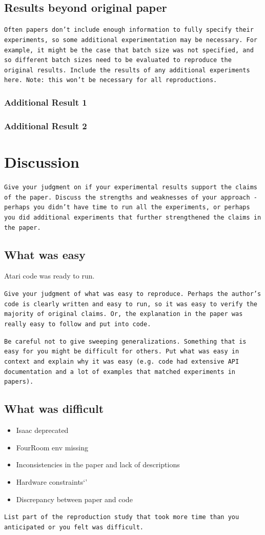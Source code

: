 \documentclass[10pt]{article} %
\begin{document}
\subsection{Results beyond original paper}
\texttt{Often papers don't include enough information to fully specify their experiments, so some additional experimentation may be necessary. For example, it might be the case that batch size was not specified, and so different batch sizes need to be evaluated to reproduce the original results. Include the results of any additional experiments here. Note: this won't be necessary for all reproductions.}
 
\subsubsection{Additional Result 1}
\subsubsection{Additional Result 2}

\section{Discussion}

\texttt{Give your judgment on if your experimental results support the claims of the paper. Discuss the strengths and weaknesses of your approach - perhaps you didn't have time to run all the experiments, or perhaps you did additional experiments that further strengthened the claims in the paper.}

\subsection{What was easy}
Atari code was ready to run. 

\texttt{Give your judgment of what was easy to reproduce. Perhaps the author's code is clearly written and easy to run, so it was easy to verify the majority of original claims. Or, the explanation in the paper was really easy to follow and put into code.}

\texttt{Be careful not to give sweeping generalizations. Something that is easy for you might be difficult for others. Put what was easy in context and explain why it was easy (e.g. code had extensive API documentation and a lot of examples that matched experiments in papers).}

\subsection{What was difficult}
\begin{itemize}
  \item Isaac deprecated 
  \item FourRoom env missing
  \item Inconsistencies in the paper and lack of descriptions
  \item Hardware constraints`'
  \item Discrepancy between paper and code
\end{itemize}
\texttt{List part of the reproduction study that took more time than you anticipated or you felt was difficult.}
\end{document}
